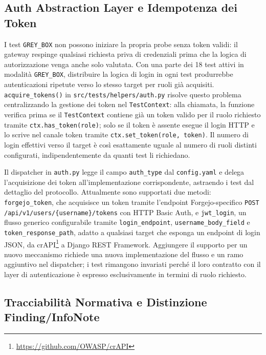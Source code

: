 \subsection{Auth Abstraction Layer e Idempotenza dei Token}\label{subsec:auth-layer}

I test \texttt{GREY\_BOX} non possono iniziare la propria probe senza token validi: il gateway respinge qualsiasi richiesta priva di credenziali prima che la logica di autorizzazione venga anche solo valutata. Con una parte dei 18 test attivi in modalità \texttt{GREY\_BOX}, distribuire la logica di login in ogni test produrrebbe autenticazioni ripetute verso lo stesso target per ruoli già acquisiti. \texttt{acquire\_tokens()} in \texttt{src/tests/helpers/auth.py} risolve questo problema centralizzando la gestione dei token nel \texttt{TestContext}: alla chiamata, la funzione verifica prima se il \texttt{TestContext} contiene già un token valido per il ruolo richiesto tramite \texttt{ctx.has\_token(role)}; solo se il token è assente esegue il login \gls{HTTP} e lo scrive nel canale token tramite \texttt{ctx.set\_token(role, token)}. Il numero di login effettivi verso il target è così esattamente uguale al numero di ruoli distinti configurati, indipendentemente da quanti test li richiedano.

Il dispatcher in \texttt{auth.py} legge il campo \texttt{auth\_type} dal \texttt{config.yaml} e delega l'acquisizione dei token all'implementazione corrispondente, astraendo i test dal dettaglio del protocollo. Attualmente sono supportati due metodi: \texttt{forgejo\_token}, che acquisisce un token tramite l'endpoint Forgejo-specifico \texttt{POST /api/v1/users/\{username\}/tokens} con HTTP Basic Auth, e \texttt{jwt\_login}, un flusso generico configurabile tramite \texttt{login\_endpoint}, \texttt{username\_body\_field} e \texttt{token\_response\_path}, adatto a qualsiasi target che esponga un endpoint di login JSON, da crAPI\footnote{\url{https://github.com/OWASP/crAPI}} a Django REST Framework. Aggiungere il supporto per un nuovo meccanismo richiede una nuova implementazione del flusso e un ramo aggiuntivo nel dispatcher; i test rimangono invariati perché il loro contratto con il layer di autenticazione è espresso esclusivamente in termini di ruolo richiesto.


\subsection{Tracciabilità Normativa e Distinzione Finding/InfoNote}\label{subsec:traceability}

